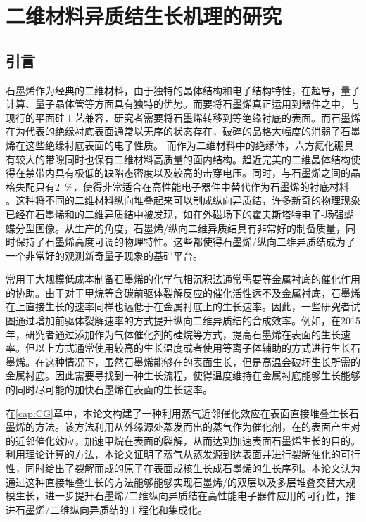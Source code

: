 \chapter{二维材料异质结生长机理的研究}
\section{引言}
石墨烯作为经典的二维材料，由于独特的晶体结构和电子结构特性，在超导，量子计算、量子晶体管等方面具有独特的优势。而要将石墨烯真正运用到器件之中，与现行的平面硅工艺兼容，研究者需要将石墨烯转移到等绝缘衬底的表面。而石墨烯在为代表的绝缘衬底表面通常以无序的状态存在，破碎的晶格大幅度的消弱了石墨烯在这些绝缘衬底表面的电子性质。
而作为二维材料中的绝缘体，六方氮化硼具有较大的带隙同时也保有二维材料高质量的面内结构。趋近完美的二维晶体结构使得在禁带内具有极低的缺陷态密度以及较高的击穿电压。同时，与石墨烯之间的晶格失配只有\SI{2}{\percent}，使得非常适合在高性能电子器件中替代作为石墨烯的衬底材料 。这种将不同的二维材料纵向堆叠起来可以制成纵向异质结，许多新奇的物理现象已经在石墨烯和的二维异质结中被发现，如在外磁场下的霍夫斯塔特电子-场强蝴蝶分型图像。从生产的角度，石墨烯/纵向二维异质结具有非常好的制备质量，同时保持了石墨烯高度可调的物理特性。这些都使得石墨烯/纵向二维异质结成为了一个非常好的观测新奇量子现象的基础平台。

常用于大规模低成本制备石墨烯的化学气相沉积法通常需要等金属衬底的催化作用的协助。由于对于甲烷等含碳前驱体裂解反应的催化活性远不及金属衬底，石墨烯在上直接生长的速率同样也远低于在金属衬底上的生长速率。因此，一些研究者试图通过增加前驱体裂解速率的方式提升纵向二维异质结的合成效率。例如，在2015年，研究者通过添加作为气体催化剂的硅烷等方式，提高石墨烯在表面的生长速率。但以上方式通常使用较高的生长温度或者使用等离子体辅助的方式进行生长石墨烯。在这种情况下，虽然石墨烯能够在的表面生长，但是高温会破坏生长所需的金属衬底。因此需要寻找到一种生长流程，使得温度维持在金属衬底能够生长能够的同时尽可能的加快石墨烯在表面的生长速率。

在\ref{cap:CG}章中，本论文构建了一种利用蒸气近邻催化效应在表面直接堆叠生长石墨烯的方法。该方法利用从外缘源处蒸发而出的蒸气作为催化剂，在的表面产生对的近邻催化效应，加速甲烷在表面的裂解，从而达到加速表面石墨烯生长的目的。利用理论计算的方法，本论文证明了蒸气从蒸发源到达表面并进行裂解催化的可行性，同时给出了裂解而成的原子在表面成核生长成石墨烯的生长序列。本论文认为通过这种直接堆叠生长的方法能够能够实现石墨烯/的双层以及多层堆叠交替大规模生长，进一步提升石墨烯/二维纵向异质结在高性能电子器件应用的可行性，推进石墨烯/二维纵向异质结的工程化和集成化。

